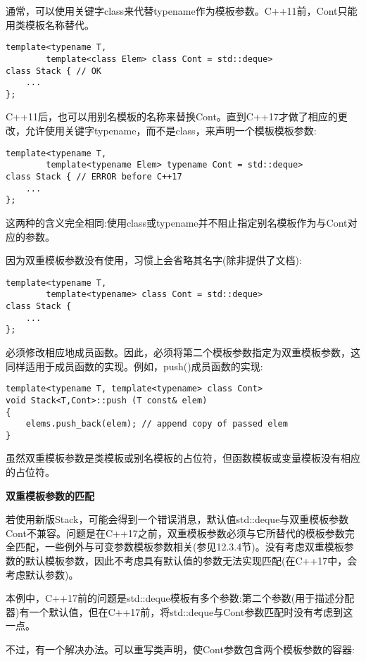 通常，可以使用关键字class来代替typename作为模板参数。C++11前，Cont只能用类模板名称替代。

\begin{lstlisting}[style=styleCXX]
template<typename T,
		template<class Elem> class Cont = std::deque>
class Stack { // OK
	...
};
\end{lstlisting}

C++11后，也可以用别名模板的名称来替换Cont。直到C++17才做了相应的更改，允许使用关键字typename，而不是class，来声明一个模板模板参数:

\begin{lstlisting}[style=styleCXX]
template<typename T,
		template<typename Elem> typename Cont = std::deque>
class Stack { // ERROR before C++17
	...
};
\end{lstlisting}

这两种的含义完全相同:使用class或typename并不阻止指定别名模板作为与Cont对应的参数。

因为双重模板参数没有使用，习惯上会省略其名字(除非提供了文档):

\begin{lstlisting}[style=styleCXX]
template<typename T,
		template<typename> class Cont = std::deque>
class Stack {
	...
};
\end{lstlisting}

必须修改相应地成员函数。因此，必须将第二个模板参数指定为双重模板参数，这同样适用于成员函数的实现。例如，push()成员函数的实现:

\begin{lstlisting}[style=styleCXX]
template<typename T, template<typename> class Cont>
void Stack<T,Cont>::push (T const& elem)
{
	elems.push_back(elem); // append copy of passed elem
}
\end{lstlisting}

虽然双重模板参数是类模板或别名模板的占位符，但函数模板或变量模板没有相应的占位符。

\noindent
\textbf{双重模板参数的匹配}

若使用新版Stack，可能会得到一个错误消息，默认值std::deque与双重模板参数Cont不兼容。问题是在C++17之前，双重模板参数必须与它所替代的模板参数完全匹配，一些例外与可变参数模板参数相关(参见12.3.4节)。没有考虑双重模板参数的默认模板参数，因此不考虑具有默认值的参数无法实现匹配(在C++17中，会考虑默认参数)。

本例中，C++17前的问题是std::deque模板有多个参数:第二个参数(用于描述分配器)有一个默认值，但在C++17前，将std::deque与Cont参数匹配时没有考虑到这一点。

不过，有一个解决办法。可以重写类声明，使Cont参数包含两个模板参数的容器:

